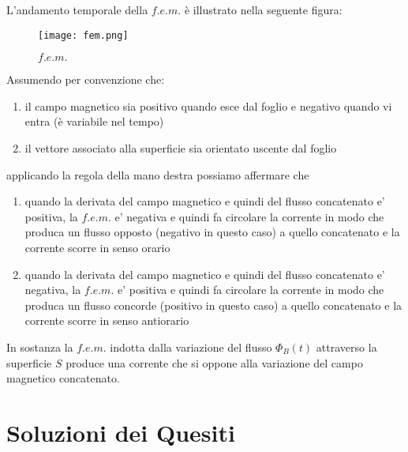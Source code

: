 \documentclass[a4paper,12pt]{article}
\begin{document}
\begin{enumerate}
L'andamento temporale della $f.e.m.$ è illustrato nella seguente figura:

\begin{figure}[H]
\centering
\texttt{[image: fem.png]}
\caption {$f.e.m.$}
\end{figure}

Assumendo per convenzione che:
\begin{enumerate}
\item il campo magnetico sia positivo quando esce dal foglio e negativo quando vi entra (è variabile nel tempo)
\item il vettore associato alla superficie sia orientato uscente dal foglio
\end{enumerate}
applicando la regola della mano destra possiamo affermare che
\begin{enumerate}
\item quando la derivata del campo magnetico e  quindi del flusso concatenato e' positiva, la $f.e.m.$ e' negativa e quindi fa circolare la corrente in modo che produca un flusso opposto (negativo in questo caso) a quello concatenato e la corrente scorre in senso orario
\item quando la derivata del campo magnetico e  quindi del flusso concatenato e' negativa, la $f.e.m.$ e' positiva e quindi fa circolare la corrente in modo che produca un flusso concorde (positivo in questo caso) a quello concatenato e la corrente scorre in senso antiorario
\end{enumerate}
In sostanza la $f.e.m.$ indotta dalla variazione del flusso $\Phi_B(t)$ attraverso la superficie $S$ produce una corrente che si oppone alla variazione del campo magnetico concatenato.
\end{enumerate}

\section{Soluzioni dei Quesiti}
\end{document}
